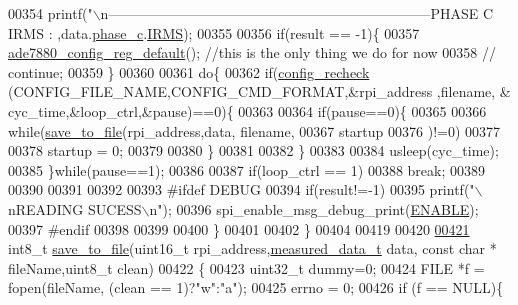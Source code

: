 \begin{DoxyCode}
{{{{{{{{{{{{{{{{{00354         printf(\textcolor{stringliteral}{"\(\backslash\)n---------------------------------------------------------------------PHASE C IRMS : %
      ,data.\hyperlink{a00028_ad8892f27909cf51f7603adfc00d224df}{phase\_c}.\hyperlink{a00029_a4f87f30b543e89e2e5dfa1b8f3f58eff}{IRMS});
00355                      
00356         \textcolor{keywordflow}{if}(result == -1)\{            
00357             \hyperlink{a00004_ga7782772c18e6ea515dcd28dcaedd0f06}{ade7880\_config\_reg\_default}(); \textcolor{comment}{//this is the only thing we do for now}
00358         \textcolor{comment}{//  continue;}
00359         \}
00360         
00361         \textcolor{keywordflow}{do}\{
00362         \textcolor{keywordflow}{if}(\hyperlink{a00002_gac93e16d1e9d6a04b52373bf3428cc79c}{config\_recheck} (CONFIG\_FILE\_NAME,CONFIG\_CMD\_FORMAT,&rpi\_address ,filename, &
      cyc\_time,&loop\_ctrl,&pause)==0)\{
00363         
00364         \textcolor{keywordflow}{if}(pause==0)\{
00365         
00366           \textcolor{keywordflow}{while}(\hyperlink{a00002_ga9e259879c5d746107c4a70fe08aba924}{save\_to\_file}(rpi\_address,data, filename,
00367           startup 
00376           )!=0)
00377         
00378           startup = 0; 
00379           
00380          \}
00381          
00382          \}
00383          
00384          usleep(cyc\_time);
00385         \}\textcolor{keywordflow}{while}(pause==1);
00386          
00387         \textcolor{keywordflow}{if}(loop\_ctrl == 1)
00388         \textcolor{keywordflow}{break};
00389         
00390         
00391         
00392                 
00393 \textcolor{preprocessor}{        #ifdef DEBUG}
00394 \textcolor{preprocessor}{}        \textcolor{keywordflow}{if}(result!=-1)
00395         printf(\textcolor{stringliteral}{"\(\backslash\)nREADING SUCESS\(\backslash\)n"});
00396         spi\_enable\_msg\_debug\_print(\hyperlink{a00036_a514ad415fb6125ba296793df7d1a468a}{ENABLE});
00397 \textcolor{preprocessor}{        #endif}
00398 \textcolor{preprocessor}{}        
00399         
00400      \}
00401 
00402 \}
00404 
00419 
00420 
\hypertarget{a00034_source_l00421}{}\hyperlink{a00002_ga9e259879c5d746107c4a70fe08aba924}{00421} int8\_t \hyperlink{a00002_ga9e259879c5d746107c4a70fe08aba924}{save\_to\_file}(uint16\_t rpi\_address,\hyperlink{a00028}{measured\_data\_t} data, \textcolor{keyword}{const} \textcolor{keywordtype}{char} *
      fileName,uint8\_t clean) 
00422 \{ 
00423 uint32\_t dummy=0;
00424   FILE *f = fopen(fileName, (clean == 1)?\textcolor{stringliteral}{"w"}:\textcolor{stringliteral}{"a"});  
00425   errno = 0;
00426   \textcolor{keywordflow}{if} (f == NULL)\{ 
}}}}}}}}}}}}}}}}}}
\end{DoxyCode}
